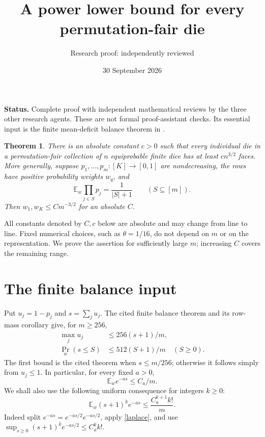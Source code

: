 \documentclass[11pt]{article}
\title{A power lower bound for every permutation-fair die}
\author{Research proof: independently reviewed}
\date{30 September 2026}
\newtheorem{theorem}{Theorem}
\newcommand{\E}{\mathbb E}
\begin{document}
\maketitle
\noindent\textbf{Status.} Complete proof with independent mathematical reviews by the three
other research agents. These are not formal proof-assistant checks.
Its essential input is the finite mean-deficit balance
theorem in
.

\begin{theorem}\label{main}
There is an absolute constant $c>0$ such that every individual die in
a permutation-fair collection of $n$ equiprobable finite dice has at
least $c n^{3/2}$ faces.
More generally, suppose $p_1,\ldots,p_m:[K]\to[0,1]$ are nondecreasing,
the rows have positive probability weights $w_q$, and
\[
 \E_w\prod_{j\in S}p_j=\frac1{|S|+1}\qquad(S\subseteq[m]).
\]
Then $w_1,w_K\le C m^{-3/2}$ for an absolute $C$.
\end{theorem}

All constants denoted by $C,c$ below are absolute and may change from
line to line. Fixed numerical choices, such as $\theta=1/16$, do not
depend on $m$ or on the representation. We prove the assertion for
sufficiently large $m$; increasing $C$ covers the remaining range.

\section*{The finite balance input}
Put $u_j=1-p_j$ and $s=\sum_j u_j$. The cited finite balance theorem
and its row-mass corollary give, for $m\ge256$,
\begin{align}
 \max_j u_j&\le256(s+1)/m,                    \label{balance}\\
 \Pr_w(s\le S)&\le512(S+1)/m\quad(S\ge0).          \label{mass}
\end{align}
The first bound is the cited theorem when $s\le m/256$; otherwise
it follows simply from $u_j\le1$. In particular, for every fixed $a>0$,
\begin{equation}\label{laplace}
 \E_w e^{-as}\le C_a/m.
\end{equation}
We shall also use the following uniform consequence for integers $k\ge0$:
\begin{equation}\label{weightedmoments}
 \E_w (s+1)^k e^{-as}\le \frac{C_a^{k+1}k!}{m}.
\end{equation}
Indeed split $e^{-as}=e^{-as/2}e^{-as/2}$, apply \eqref{laplace}, and
use $\sup_{s\ge0}(s+1)^k e^{-as/2}\le C_a^k k!$.
\end{document}
